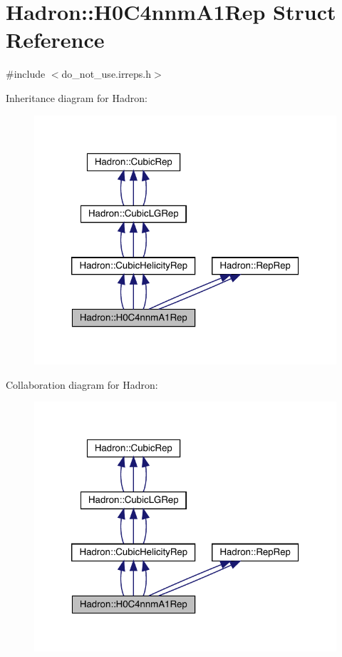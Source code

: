\hypertarget{structHadron_1_1H0C4nnmA1Rep}{}\section{Hadron\+:\+:H0\+C4nnm\+A1\+Rep Struct Reference}
\label{structHadron_1_1H0C4nnmA1Rep}


{\ttfamily \#include $<$do\+\_\+not\+\_\+use.\+irreps.\+h$>$}



Inheritance diagram for Hadron\+:
\nopagebreak
\begin{figure}[H]
\begin{center}
\leavevmode
\includegraphics[width=320pt]{da/d76/structHadron_1_1H0C4nnmA1Rep__inherit__graph}
\end{center}
\end{figure}


Collaboration diagram for Hadron\+:
\nopagebreak
\begin{figure}[H]
\begin{center}
\leavevmode
\includegraphics[width=320pt]{d8/d31/structHadron_1_1H0C4nnmA1Rep__coll__graph}
\end{center}
\end{figure}
